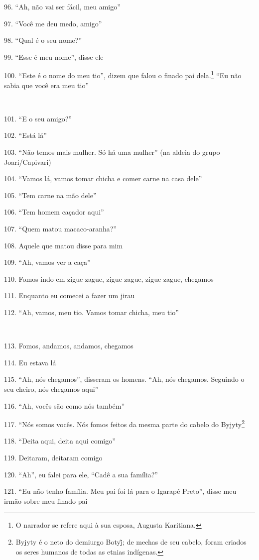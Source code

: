 96. ``Ah, não vai ser fácil, meu amigo''

97. ``Você me deu medo, amigo''

98. ``Qual é o seu nome?''

99. ``Esse é meu nome'', disse ele

100. ``Este é o nome do meu tio'', dizem que falou o finado pai
dela.\footnote{O narrador se refere aqui à sua esposa, Augusta Karitiana.}
``Eu não sabia que você era meu tio''

~

101. ``E o seu amigo?''

102. ``Está lá''

103. ``Não temos mais mulher. Só há uma mulher'' (na aldeia do grupo
Joari/Capivari)

104. ``Vamos lá, vamos tomar chicha e comer carne na casa dele''

105. ``Tem carne na mão dele''

106. ``Tem homem caçador aqui''

107. ``Quem matou macaco-aranha?''

108. Aquele que matou disse para mim

109. ``Ah, vamos ver a caça''

110. Fomos indo em zigue-zague, zigue-zague, zigue-zague, chegamos

111. Enquanto eu comecei a fazer um jirau

112. ``Ah, vamos, meu tio. Vamos tomar chicha, meu tio''

~

113. Fomos, andamos, andamos, chegamos

114. Eu estava lá

115. ``Ah, nós chegamos'', disseram os homens. ``Ah, nós chegamos.
Seguindo o seu cheiro, nós chegamos aqui''

116. ``Ah, vocês são como nós também''

117. ``Nós somos vocês. Nós fomos feitos da mesma parte do cabelo do
Byjyty\footnote{Byjyty é o neto do demiurgo Botyj̃;  de mechas de seu
  cabelo, foram criados os seres humanos de todas as etnias indígenas.}

118. ``Deita aqui, deita aqui comigo''

119. Deitaram, deitaram comigo

120. ``Ah'', eu falei para ele, ``Cadê a sua família?''

121. ``Eu não tenho família. Meu pai foi lá para o Igarapé Preto'', disse
meu irmão sobre meu finado pai

